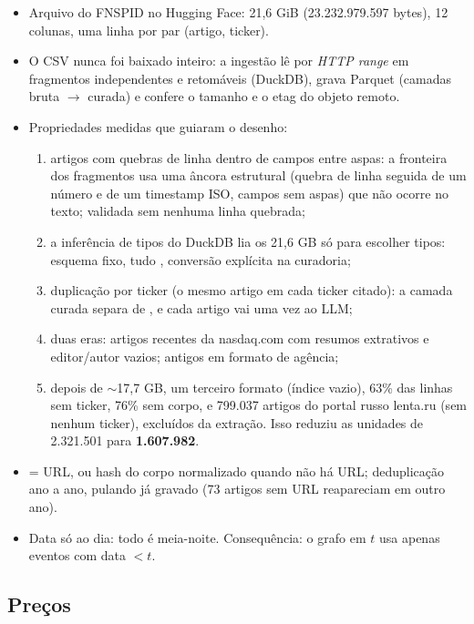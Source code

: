 \documentclass[11pt,a4paper]{article}
\begin{document}
\begin{itemize}
  \item Arquivo  do FNSPID \citep{dong2024fnspid} no Hugging Face:
        21,6 GiB (23.232.979.597 bytes), 12 colunas, uma linha por par (artigo, ticker).
  \item O CSV nunca foi baixado inteiro: a ingestão lê por \emph{HTTP range} em fragmentos
        independentes e retomáveis (DuckDB), grava Parquet (camadas bruta $\to$ curada) e confere o
        tamanho e o etag do objeto remoto.
  \item Propriedades medidas que guiaram o desenho:
        \begin{enumerate}
          \item artigos com quebras de linha dentro de campos entre aspas: a fronteira dos fragmentos
                usa uma âncora estrutural (quebra de linha seguida de um número e de um timestamp ISO, campos sem aspas) que não ocorre no texto;
                validada sem nenhuma linha quebrada;
          \item a inferência de tipos do DuckDB lia os 21,6 GB só para escolher tipos: esquema fixo, tudo
                , conversão explícita na curadoria;
          \item duplicação por ticker (o mesmo artigo em cada ticker citado): a camada curada separa
                 de , e cada artigo vai uma vez ao LLM;
          \item duas eras: artigos recentes da nasdaq.com com resumos extrativos e editor/autor vazios;
                antigos em formato de agência;
          \item depois de $\sim$17,7 GB, um terceiro formato (índice vazio), 63\% das linhas sem ticker,
                76\% sem corpo, e 799.037 artigos do portal russo lenta.ru (sem nenhum ticker),
                excluídos da extração. Isso reduziu as unidades de 2.321.501 para \textbf{1.607.982}.
        \end{enumerate}
  \item {} = URL, ou hash do corpo normalizado quando não há URL; deduplicação ano a ano,
        pulando  já gravado (73 artigos sem URL reapareciam em outro ano).
  \item Data só ao dia: todo  é meia-noite. Consequência: o grafo em $t$ usa apenas
        eventos com data $<t$.
\end{itemize}

\subsection{Preços}
\end{document}
